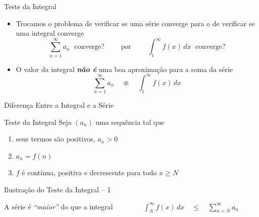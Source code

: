 \begin{frame}{Teste da Integral}
  \begin{itemize}
    \item Trocamos o problema de verificar se uma série converge para o de
    verificar se uma integral converge
    \[ \sum_{n=1}^{\infty} a_n  \;\text{ converge?}
       \qquad \text{ por } \qquad
       \int_{1}^{\infty} f(x) \,dx  \;\text{ converge?}
    \]
    \pause
    \item O valor da integral \emph{\textbf{não é}} uma boa aproximação para a soma da série
    \[ \sum_{n=1}^{\infty} a_n  \quad \not\approx \quad \int_{1}^{\infty} f(x) \,dx\]
  \end{itemize}
\end{frame}

\begin{frame}{Diferença Entre a Integral e a Série}
  \begin{center}
    
  \end{center}
\end{frame}

\begin{frame}[t]{Teste da Integral}
  Seja $(a_n)$ uma sequência tal que
  \begin{enumerate}[<+->]
    \item seus termos são positivos, $a_n>0$
    \item $a_n=f(n)$
    \item $f$ é contínua, positiva e decrescente para todo $x \geq N$
  \end{enumerate}

\end{frame}

\begin{frame}{Ilustração do Teste da Integral -- 1}
  \begin{center}
    \scalebox{.9}{}
  \end{center}

  \pause
  A série é \emph{``maior''} do que a integral
  \pause
  \(
    \qquad\qquad
    \int_{N}^{\infty} f(x)\,dx
    \quad\leq\quad
    \sum_{n=N}^{\infty} a_n
  \)
\end{frame}

